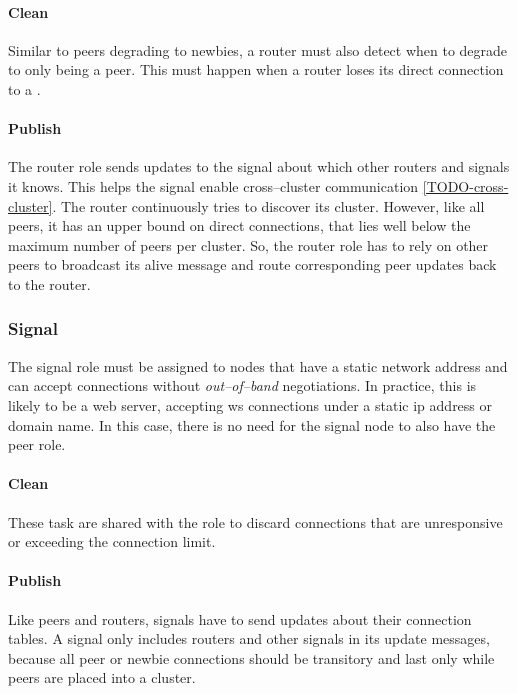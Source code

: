 \paragraph{Clean}
\begin{itemize}
     Similar to peers degrading to newbies, a router must also detect when to degrade to only being a peer. This must happen when a router loses its direct connection to a \signalRole.
\end{itemize}

\paragraph{Publish}
\begin{itemize}
     The router role sends updates to the signal about which other routers and signals it knows. This helps the signal enable cross–cluster communication \ref{TODO-cross-cluster}.
     The router continuously tries to discover its cluster. However, like all peers, it has an upper bound on direct connections, that lies well below the maximum number of peers per cluster. So, the router role has to rely on other peers to broadcast its alive message and route corresponding peer updates back to the router.
\end{itemize}

\subsubsection{Signal}
The signal role must be assigned to nodes that have a static network address and can accept connections without \textit{out–of–band} negotiations. In practice, this is likely to be a web server, accepting \gls{ws} connections under a static \gls{ip} address or domain name. In this case, there is no need for the signal node to also have the peer role.

\paragraph{Clean}
\begin{itemize}
     These task are shared with the \peerRole role to discard connections that are unresponsive or exceeding the connection limit.
\end{itemize}

\paragraph{Publish}
\begin{itemize}
     Like peers and routers, signals have to send updates about their connection tables. A signal only includes routers and other signals in its update messages, because all peer or newbie connections should be transitory and last only while peers are placed into a cluster.
\end{itemize}


